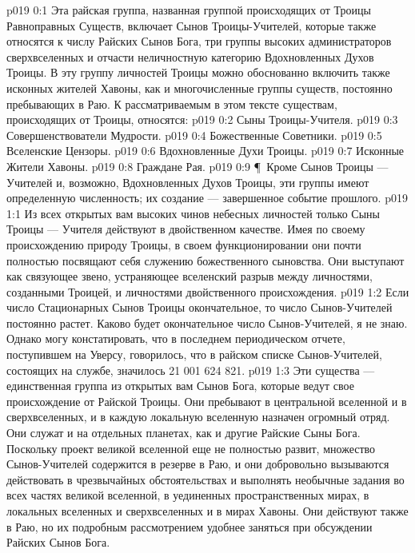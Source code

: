 \vs p019 0:1 Эта райская группа, названная группой происходящих от Троицы Равноправных Существ, включает Сынов Троицы\hyp{}Учителей, которые также относятся к числу Райских Сынов Бога, три группы высоких администраторов сверхвселенных и отчасти неличностную категорию Вдохновленных Духов Троицы. В эту группу личностей Троицы можно обоснованно включить также исконных жителей Хавоны, как и многочисленные группы существ, постоянно пребывающих в Раю. К рассматриваемым в этом тексте существам, происходящих от Троицы, относятся:
\vs p019 0:2 \bibnobreakspace Сыны Троицы\hyp{}Учителя.
\vs p019 0:3 \bibnobreakspace Совершенствователи Мудрости.
\vs p019 0:4 \bibnobreakspace Божественные Советники.
\vs p019 0:5 \bibnobreakspace Вселенские Цензоры.
\vs p019 0:6 \bibnobreakspace Вдохновленные Духи Троицы.
\vs p019 0:7 \bibnobreakspace Исконные Жители Хавоны.
\vs p019 0:8 \bibnobreakspace Граждане Рая.
\vs p019 0:9 \P\ Кроме Сынов Троицы --- Учителей и, возможно, Вдохновленных Духов Троицы, эти группы имеют определенную численность; их создание --- завершенное событие прошлого.
\vs p019 1:1 Из всех открытых вам высоких чинов небесных личностей только Сыны Троицы --- Учителя действуют в двойственном качестве. Имея по своему происхождению природу Троицы, в своем функционировании они почти полностью посвящают себя служению божественного сыновства. Они выступают как связующее звено, устраняющее вселенский разрыв между личностями, созданными Троицей, и личностями двойственного происхождения.
\vs p019 1:2 Если число Стационарных Сынов Троицы окончательное, то число Сынов\hyp{}Учителей постоянно растет. Каково будет окончательное число Сынов\hyp{}Учителей, я не знаю. Однако могу констатировать, что в последнем периодическом отчете, поступившем на Уверсу, говорилось, что в райском списке Сынов\hyp{}Учителей, состоящих на службе, значилось 21 001 624 821.
\vs p019 1:3 Эти существа --- единственная группа из открытых вам Сынов Бога, которые ведут свое происхождение от Райской Троицы. Они пребывают в центральной вселенной и в сверхвселенных, и в каждую локальную вселенную назначен огромный отряд. Они служат и на отдельных планетах, как и другие Райские Сыны Бога. Поскольку проект великой вселенной еще не полностью развит, множество Сынов\hyp{}Учителей содержится в резерве в Раю, и они добровольно вызываются действовать в чрезвычайных обстоятельствах и выполнять необычные задания во всех частях великой вселенной, в уединенных пространственных мирах, в локальных вселенных и сверхвселенных и в мирах Хавоны. Они действуют также в Раю, но их подробным рассмотрением удобнее заняться при обсуждении Райских Сынов Бога.
